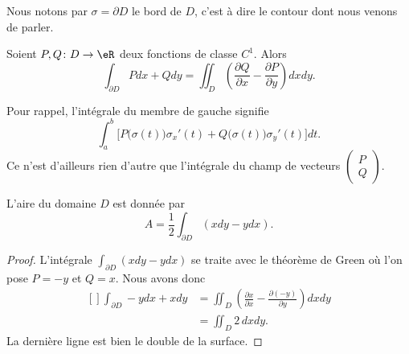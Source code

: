 Nous notons par $\sigma=\partial D$ le bord de $D$, c'est à dire le contour dont nous venons de parler.

\begin{theorem}
    Soient $P,Q\colon D\to \eR$ deux fonctions de classe $C^1$. Alors
    \begin{equation}        \label{EqThoGreen}
        \int_{\partial D} Pdx+Qdy=\iint_D\left( \frac{ \partial Q }{ \partial x }-\frac{ \partial P }{ \partial y } \right)dxdy.
    \end{equation}
\end{theorem}
Pour rappel, l'intégrale du membre de gauche signifie
\begin{equation}
    \int_a^b \Big[P\big( \sigma(t) \big)\sigma_x'(t)+Q\big( \sigma(t) \big)\sigma_y'(t)\Big]dt.
\end{equation}
Ce n'est d'ailleurs rien d'autre que l'intégrale du champ de vecteurs $\begin{pmatrix}
    P    \\ 
    Q    
\end{pmatrix}$.

\begin{corollary}
    L'aire du domaine $D$ est donnée par
    \begin{equation}
        A=\frac{ 1 }{2}\int_{\partial D}(xdy-ydx).
    \end{equation}
\end{corollary}

\begin{proof}
    L'intégrale $\int_{\partial D}(xdy-ydx)$ se traite avec le théorème de Green où l'on pose $P=-y$ et $Q=x$. Nous avons donc
    \begin{equation}
        \begin{aligned}[]
            \int_{\partial D} -ydx+xdy&=\iint_D\left( \frac{ \partial x }{ \partial x }-\frac{ \partial (-y) }{ \partial y } \right)dxdy\\
            &=\iint_D2\,dxdy.
        \end{aligned}
    \end{equation}
    La dernière ligne est bien le double de la surface.
\end{proof}

